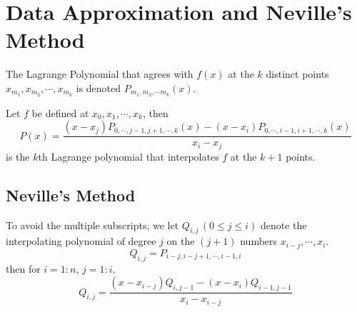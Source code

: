 \section{Data Approximation and Neville's Method}
\begin{defn}
The Lagrange Polynomial that agrees with $f(x)$ at the $k$ distinct points $x_{m_1},x_{m_2},\cdots,x_{m_k}$ is denoted $P_{m_1,m_2,\cdots m_k}(x)$.
\end{defn}
\begin{theo}
Let $f$ be defined at $x_0,x_1,\cdots,x_k$, then
\[
P(x)=\frac{(x-x_j)P_{0,\cdots,j-1,j+1,\cdots,k}(x)-(x-x_i)P_{0,\cdots,i-1,i+1,\cdots,k}(x)}{x_i-x_j}
\]
is the $k$th Lagrange polynomial that interpolates $f$ at the $k+1$ points.
\end{theo}

\subsection{Neville's Method}
To avoid the multiple subscripts, we let $Q_{i,j}\,(0\leq j\leq i)$ denote the interpolating polynomial of degree $j$ on the $(j+1)$ numbers $x_{i-j},\cdots,x_{i}$.
\[
Q_{i,j} = P_{i-j,i-j+1,\cdots,i-1,i}
\]
then for $i=1:n$, $j=1:i$,
\[
Q_{i,j}=\frac{(x-x_{i-j})Q_{i,j-1}-(x-x_i)Q_{i-1,j-1}}{x_i-x_{i-j}}
\]